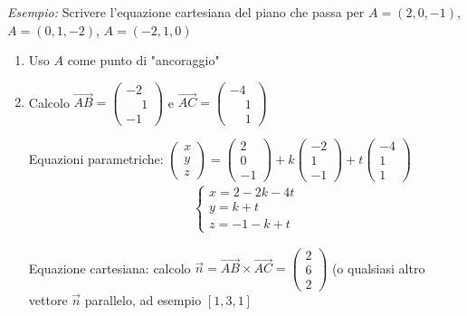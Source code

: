 \documentclass[../main.tex]{subfiles}
\begin{document}
\vspace{0.5cm}
\textit{Esempio:} Scrivere l'equazione cartesiana del piano che passa per $A=(2,0,-1)$, $A=(0,1,-2)$, $A=(-2,1,0)$
\begin{enumerate}
    \item Uso $A$ come punto di "ancoraggio"
    \item Calcolo $\vec{AB} = \begin{pmatrix}
        -2 \\
        \phantom{-}1 \\
        -1
    \end{pmatrix}$ e $\vec{AC} = \begin{pmatrix}
        -4 \\
        \phantom{-}1 \\
        \phantom{-}1
    \end{pmatrix}$

    Equazioni parametriche: $\begin{pmatrix}
        x \\ y \\ z
    \end{pmatrix} = \begin{pmatrix}
        2 \\ 0 \\ -1
    \end{pmatrix} +k \begin{pmatrix}
        -2 \\ 1 \\ -1
    \end{pmatrix} +t \begin{pmatrix}
        -4 \\ 1 \\1
    \end{pmatrix}$
    \begin{align*}
        \begin{cases}
            x = 2-2k-4t \\
            y = k+t \\
            z = -1-k+t
        \end{cases}
    \end{align*}

    Equazione cartesiana: calcolo $\vec{n} = \vec{AB} \times \vec{AC} = \begin{pmatrix}
        2 \\ 6 \\ 2 
    \end{pmatrix}$ (o qualsiasi altro vettore $\vec{n}$ parallelo, ad esempio $[1,3,1]$


\end{enumerate}
\end{document}
